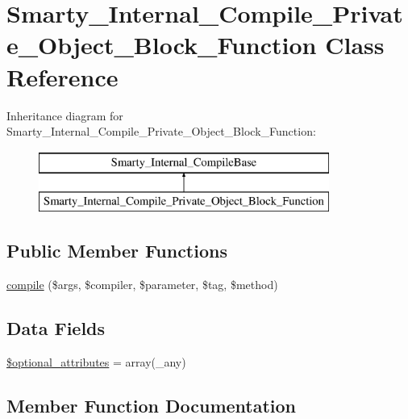 \hypertarget{class_smarty___internal___compile___private___object___block___function}{}\section{Smarty\+\_\+\+Internal\+\_\+\+Compile\+\_\+\+Private\+\_\+\+Object\+\_\+\+Block\+\_\+\+Function Class Reference}
\label{class_smarty___internal___compile___private___object___block___function}
Inheritance diagram for Smarty\+\_\+\+Internal\+\_\+\+Compile\+\_\+\+Private\+\_\+\+Object\+\_\+\+Block\+\_\+\+Function\+:\begin{figure}[H]
\begin{center}
\leavevmode
\includegraphics[height=2.000000cm]{class_smarty___internal___compile___private___object___block___function}
\end{center}
\end{figure}
\subsection*{Public Member Functions}
\begin{DoxyCompactItemize}
\item 
\hyperlink{class_smarty___internal___compile___private___object___block___function_a7ec609b50c3b7c79cfd21ed991e01235}{compile} (\$args, \$compiler, \$parameter, \$tag, \$method)
\end{DoxyCompactItemize}
\subsection*{Data Fields}
\begin{DoxyCompactItemize}
\item 
\hyperlink{class_smarty___internal___compile___private___object___block___function_a899d1eb4a6fecbd6ce696adb171c80a4}{\$optional\+\_\+attributes} = array(\textquotesingle{}\+\_\+any\textquotesingle{})
\end{DoxyCompactItemize}


\subsection{Member Function Documentation}
\hypertarget{class_smarty___internal___compile___private___object___block___function_a7ec609b50c3b7c79cfd21ed991e01235}{}
